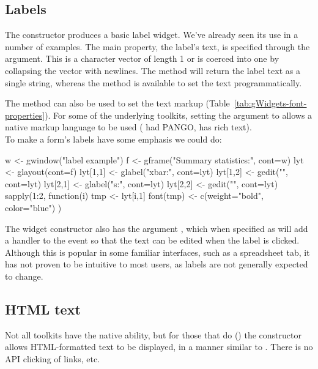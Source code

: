 

\subsection{Labels}
\label{asec:gWidgets-labels}

The  constructor produces a basic label
widget. We've already seen its use in a number of examples. The main
property, the label's text, is specified through the
 argument. This is a character vector of length
1 or is coerced into one by collapsing the vector with newlines. The
 method will return the label text as a single
string, whereas the  method is
available to set the text programmatically.

The  method
can also be used to set the text markup
(Table~\ref{tab:gWidgets-font-properties}).  
For  some of the underlying toolkits, setting the argument
 to  allows a native markup language
to be used (\GTK\/ had PANGO, \Qt\/ has rich text).
\\

To make a form's labels have some emphasis we could do:
\begin{Schunk}
\begin{Sinput}
 w <- gwindow("label example")
 f <- gframe("Summary statistics:", cont=w)
 lyt <- glayout(cont=f)
 lyt[1,1] <- glabel("xbar:", cont=lyt)
 lyt[1,2] <- gedit("", cont=lyt)
 lyt[2,1] <- glabel("s:", cont=lyt)
 lyt[2,2] <- gedit("", cont=lyt)
 sapply(1:2, function(i) {
   tmp <- lyt[i,1]
   font(tmp) <- c(weight="bold", color="blue")
 })
\end{Sinput}
\end{Schunk}


The widget constructor also has the argument
, which when specified as  will
add a handler to the event so that the text can be edited when the
label is clicked.  Although this is popular in some familiar
interfaces, such as a spreadsheet tab, it has not proven to be
intuitive to most users, as labels are not generally expected to change.

\subsection{HTML text}
\label{sec:html-text}

Not all toolkits have the native ability, but for those that do (\Qt) the
 constructor allows HTML-formatted text to be
displayed, in a manner similar to . There is no
API clicking of links, etc.

